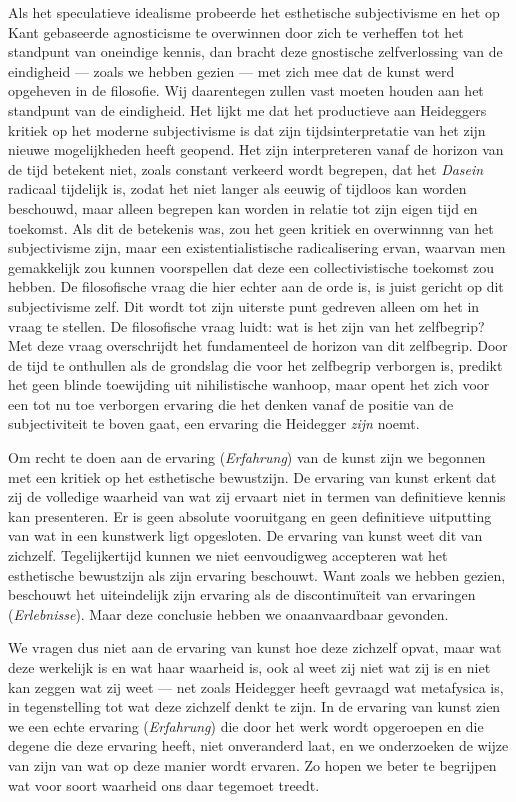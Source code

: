Als het speculatieve idealisme probeerde het esthetische subjectivisme en het op Kant gebaseerde agnosticisme te overwinnen door zich te verheffen tot het standpunt van oneindige kennis, dan bracht deze gnostische zelfverlossing van de eindigheid — zoals we hebben gezien — met zich mee dat de kunst werd opgeheven in de filosofie.
Wij daarentegen zullen vast moeten houden aan het standpunt van de eindigheid. Het lijkt me dat het productieve aan Heideggers kritiek op het moderne subjectivisme is dat zijn tijdsinterpretatie van het zijn nieuwe mogelijkheden heeft geopend.
Het zijn interpreteren vanaf de horizon van de tijd betekent niet, zoals constant verkeerd wordt begrepen, dat het \textit{Dasein} radicaal tijdelijk is, zodat het niet langer als eeuwig of tijdloos kan worden beschouwd, maar alleen begrepen kan worden in relatie tot zijn eigen tijd en toekomst. Als dit de betekenis was, zou het geen kritiek en overwinnng van het subjectivisme zijn, maar een existentialistische radicalisering ervan, waarvan men gemakkelijk zou kunnen voorspellen dat deze een collectivistische toekomst zou hebben. De filosofische vraag die hier echter aan de orde is, is juist gericht op dit subjectivisme zelf. Dit wordt tot zijn uiterste punt gedreven alleen om het in vraag te stellen. De filosofische vraag luidt: wat is het zijn van het zelfbegrip? Met deze vraag overschrijdt het fundamenteel de horizon van dit zelfbegrip. Door de tijd te onthullen als de grondslag die voor het zelfbegrip verborgen is, predikt het geen blinde toewijding uit nihilistische wanhoop, maar opent het zich voor een tot nu toe verborgen ervaring die het denken vanaf de positie van de subjectiviteit te boven gaat, een ervaring die Heidegger \textit{zijn} noemt.

Om recht te doen aan de ervaring (\textit{Erfahrung}) van de kunst zijn we begonnen met een kritiek op het esthetische bewustzijn. De ervaring van kunst erkent dat zij de volledige waarheid van wat zij ervaart niet in termen van definitieve kennis kan presenteren. Er is geen absolute vooruitgang en geen definitieve uitputting van wat in een kunstwerk ligt opgesloten. De ervaring van kunst weet dit van zichzelf.
Tegelijkertijd kunnen we niet eenvoudigweg accepteren wat het esthetische bewustzijn als zijn ervaring beschouwt. Want zoals we hebben gezien, beschouwt het uiteindelijk zijn ervaring als de discontinuïteit van ervaringen (\textit{Erlebnisse}). Maar deze conclusie hebben we onaanvaardbaar gevonden.

We vragen dus niet aan de ervaring van kunst hoe deze zichzelf opvat, maar wat deze werkelijk is en wat haar waarheid is, ook al weet zij niet wat zij is en niet kan zeggen wat zij weet — net zoals Heidegger heeft gevraagd wat metafysica is, in tegenstelling tot wat deze zichzelf denkt te zijn. In de ervaring van kunst zien we een echte ervaring (\textit{Erfahrung}) die door het werk wordt opgeroepen en die degene die deze ervaring heeft, niet onveranderd laat, en we onderzoeken de wijze van zijn van wat op deze manier wordt ervaren. Zo hopen we beter te begrijpen wat voor soort waarheid ons daar tegemoet treedt.

